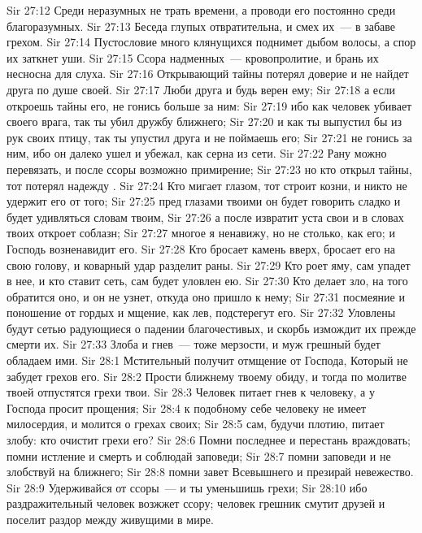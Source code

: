\vs Sir 27:12 Среди неразумных не трать времени, а проводи его постоянно среди благоразумных.
\vs Sir 27:13 Беседа глупых отвратительна, и смех их~--- в забаве грехом.
\vs Sir 27:14 Пустословие много клянущихся поднимет дыбом волосы, а спор их заткнет уши.
\vs Sir 27:15 Ссора надменных~--- кровопролитие, и брань их несносна для слуха.
\vs Sir 27:16 Открывающий тайны потерял доверие и не найдет друга по душе своей.
\vs Sir 27:17 Люби друга и будь верен ему;
\vs Sir 27:18 а если откроешь тайны его, не гонись больше за ним:
\vs Sir 27:19 ибо как человек убивает своего врага, так ты убил дружбу ближнего;
\vs Sir 27:20 и как ты выпустил бы из рук своих птицу, так ты упустил друга и не поймаешь его;
\vs Sir 27:21 не гонись за ним, ибо он далеко ушел и убежал, как серна из сети.
\vs Sir 27:22 Рану можно перевязать, и после ссоры возможно примирение;
\vs Sir 27:23 но кто открыл тайны, тот потерял надежду .
\vs Sir 27:24 Кто мигает глазом, тот строит козни, и никто не удержит его от того;
\vs Sir 27:25 пред глазами твоими он будет говорить сладко и будет удивляться словам твоим,
\vs Sir 27:26 а после извратит уста свои и в словах твоих откроет соблазн;
\vs Sir 27:27 многое я ненавижу, но не столько, как его; и Господь возненавидит его.
\rsbpar\vs Sir 27:28 Кто бросает камень вверх, бросает его на свою голову, и коварный удар разделит раны.
\vs Sir 27:29 Кто роет яму, сам упадет в нее, и кто ставит сеть, сам будет уловлен ею.
\vs Sir 27:30 Кто делает зло, на того обратится оно, и он не узнет, откуда оно пришло к нему;
\vs Sir 27:31 посмеяние и поношение от гордых и мщение, как лев, подстерегут его.
\vs Sir 27:32 Уловлены будут сетью радующиеся о падении благочестивых, и скорбь измождит их прежде смерти их.
\vs Sir 27:33 Злоба и гнев~--- тоже мерзости, и муж грешный будет обладаем ими.
\vs Sir 28:1 Мстительный получит отмщение от Господа, Который не забудет грехов его.
\vs Sir 28:2 Прости ближнему твоему обиду, и тогда по молитве твоей отпустятся грехи твои.
\vs Sir 28:3 Человек питает гнев к человеку, а у Господа просит прощения;
\vs Sir 28:4 к подобному себе человеку не имеет милосердия, и молится о грехах своих;
\vs Sir 28:5 сам, будучи плотию, питает злобу: кто очистит грехи его?
\vs Sir 28:6 Помни последнее и перестань враждовать; помни истление и смерть и соблюдай заповеди;
\vs Sir 28:7 помни заповеди и не злобствуй на ближнего;
\vs Sir 28:8 помни завет Всевышнего и презирай невежество.
\vs Sir 28:9 Удерживайся от ссоры~--- и ты уменьшишь грехи;
\vs Sir 28:10 ибо раздражительный человек возжжет ссору; человек грешник смутит друзей и поселит раздор между живущими в мире.
